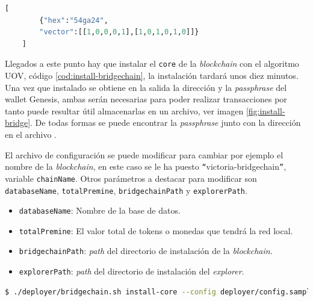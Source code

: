 \begin{lstlisting}[language=Python,caption=Ejemplo fichero \texttt{signature.json}, label=cod:signature-json]
	[
		{"hex":"54ga24",
		"vector":[[1,0,0,0,1],[1,0,1,0,1,0]]}
	]
\end{lstlisting}


Llegados a este punto hay que instalar el \texttt{core} de la \textit{blockchain} con el algoritmo UOV, código \ref{cod:install-bridgechain}, la instalación tardará unos diez minutos. Una vez que instalado se obtiene en la salida la dirección y la \textit{passphrase} del wallet Genesis, ambas serán necesarias para poder realizar transacciones por tanto puede resultar útil almacenarlas en un archivo, ver imagen \ref{fig:install-bridge}. De todas formas se puede encontrar la \textit{passphrase} junto con la dirección en el archivo . 

El archivo de configuración  se puede modificar para cambiar por ejemplo el nombre de la \textit{blockchain}, en este caso se le ha puesto  \texttt{``{}}victoria-bridgechain\texttt{''}, variable \texttt{chainName}. Otros parámetros a destacar para modificar son \texttt{databaseName}, \texttt{totalPremine}, \texttt{bridgechainPath} y \texttt{explorerPath}.

\begin{itemize}
	\item \texttt{databaseName}: Nombre de la base de datos.
	\item \texttt{totalPremine}: El valor total de tokens o monedas que tendrá la red local.
	\item \texttt{bridgechainPath}: \textit{path} del directorio de instalación de la \textit{blockchain}.
	\item \texttt{explorerPath}: \textit{path} del directorio de instalación del \textit{explorer}.
\end{itemize}

\begin{lstlisting}[language=Bash,caption=Instalación \textit{blockchain}. Parte XI, label=cod:install-bridgechain, style=Consola]
	$ ./deployer/bridgechain.sh install-core --config deployer/config.sample.conf --autoinstall-deps --non-interactive
\end{lstlisting}

